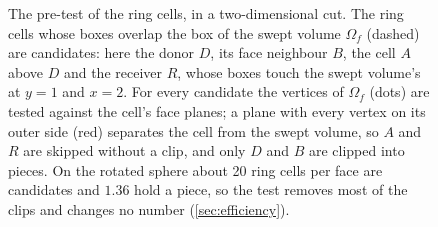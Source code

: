 \begin{figure}[htbp]
\caption{The pre-test of the ring cells, in a two-dimensional cut. The ring cells whose boxes overlap the box of the swept volume $\Omega_f$ (dashed) are candidates: here the donor $D$, its face neighbour $B$, the cell $A$ above $D$ and the receiver $R$, whose boxes touch the swept volume's at $y = 1$ and $x = 2$. For every candidate the vertices of $\Omega_f$ (dots) are tested against the cell's face planes; a plane with every vertex on its outer side (red) separates the cell from the swept volume, so $A$ and $R$ are skipped without a clip, and only $D$ and $B$ are clipped into pieces. On the rotated sphere about 20 ring cells per face are candidates and $1.36$ hold a piece, so the test removes most of the clips and changes no number (\cref{sec:efficiency}).}
\label{fig:pretest}
\end{figure}
